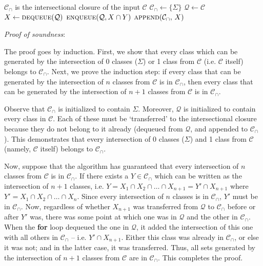 \documentclass[11pt, oneside]{article}   	%
\begin{document}
\noindent \begin{algorithmic}
    \ENSURE $\mathcal C_\cap$ is the intersectional closure of the input $\mathcal C$
    \STATE
    \STATE $\mathcal C_\cap \leftarrow \{ \Sigma \} $
    \STATE $\mathcal Q \leftarrow \mathcal C$
    \STATE
        \STATE $X \leftarrow \textsc{dequeue}(\mathcal Q)$
                \STATE $\textsc{enqueue}(\mathcal Q, X \cap Y)$
            \ENDFOR
            \STATE $\textsc{append}(\mathcal C_\cap, \, X)$
        \ENDIF
    \ENDWHILE
\end{algorithmic}

\vspace{\baselineskip} \noindent \textit{Proof of soundness}:

The proof goes by induction. First, we show that every class which can be generated by the intersection of $0$ classes ($\Sigma$) or 1 class from $\mathcal C$ (i.e. $\mathcal C$ itself) belongs to $\mathcal C_\cap$. Next, we prove the induction step: if every class that can be generated by the intersection of $n$ classes from $\mathcal C$ is in $\mathcal C_\cap$, then every class that can be generated by the intersection of $n+1$ classes from $\mathcal C$ is in $\mathcal C_\cap$.

Observe that $\mathcal C_\cap$ is initialized to contain $\Sigma$. Moreover, $\mathcal Q$ is initialized to contain every class in $\mathcal C$. Each of these must be `transferred' to the intersectional closure because they do not belong to it already (dequeued from $\mathcal Q$, and appended to $\mathcal C_\cap$). This demonstrates that every intersection of 0 classes ($\Sigma$) and 1 class from $\mathcal C$ (namely, $\mathcal C$ itself) belongs to $\mathcal C_\cap$.

Now, suppose that the algorithm has guaranteed that every intersection of $n$ classes from $\mathcal C$ is in $\mathcal C_\cap$. If there exists a $Y \in \mathcal C_\cap$ which can be written as the intersection of $n+1$ classes, i.e. $Y = X_1 \cap X_2 \cap \ldots \cap X_{n+1} = Y' \cap X_{n+1}$ where $Y' = X_1 \cap X_2 \cap \ldots \cap X_n$. Since every intersection of $n$ classes is in $\mathcal C_\cap$, $Y'$ must be in $\mathcal C_\cap$. Now, regardless of whether $X_{n+1}$ was transferred from $\mathcal Q$ to $\mathcal C_\cap$ before or after $Y'$ was, there was some point at which one was in $\mathcal Q$ and the other in $\mathcal C_\cap$. When the \textbf{for} loop dequeued the one in $\mathcal Q$, it added the intersection of this one with all others in $\mathcal C_\cap$ -- i.e. $Y' \cap X_{n+1}$. Either this class was already in $\mathcal C_\cap$, or else it was not; and in the latter case, it was transferred. Thus, all sets generated by the intersection of $n+1$ classes from $\mathcal C$ are in $\mathcal C_\cap$. This completes the proof.
\end{document}
